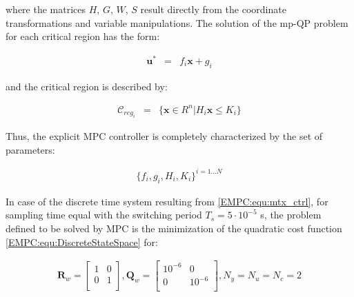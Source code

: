     where the matrices $H$, $G$, $W$, $S$ result directly from the coordinate transformations and variable manipulations. The solution of the mp-QP problem for each critical region has the form:

    \begin{equation}
        \begin{array}{rcl}
            \boldsymbol{u}^*&=&f_i\boldsymbol{x}+g_i
        \end{array}
        \label{EMPC:equ:quadratic_regions}
    \end{equation}

    and the critical region is described by:

    \begin{equation}
        \begin{array}{rcl}
            \mathcal{C}_{reg_i}&=&\{\boldsymbol{x}\in R^n|H_i\boldsymbol{x}\leq K_i\}
        \end{array}
        \label{EMPC:equ:quadratic_critical}
    \end{equation}

    Thus, the explicit MPC controller is completely characterized by the set of parameters:

    \begin{equation}
        \begin{array}{l}
            \{f_i,g_i,H_i,K_i\}^{i=1\dots N}
        \end{array}
        \label{EMPC:equ:quadratic_set}
    \end{equation}

    In case of the discrete time system resulting from \ref{EMPC:equ:mtx_ctrl}, for sampling time equal with the switching period $T_s=5\cdot10^{-5}$  s, the problem defined to be solved by MPC is the minimization of the quadratic cost function \ref{EMPC:equ:DiscreteStateSpace} for:

    \begin{equation}
        \begin{array}{l}
            \boldsymbol{R}_w=\begin{bmatrix}
                1& 0\\
                0& 1\\
            \end{bmatrix},
            \boldsymbol{Q}_w=\begin{bmatrix}
                10^{-6}& 0\\
                0& 10^{-6}\\
            \end{bmatrix},
            N_y=N_u=N_c=2
        \end{array}
        \label{EMPC:equ:quadratic_mtx_set}
    \end{equation}

